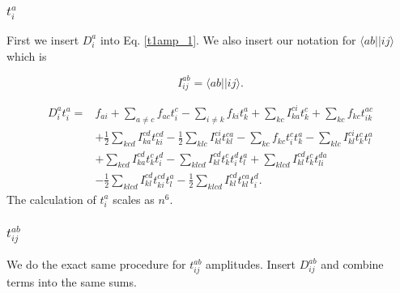 \subsubsection{$t_i^a$}
First we insert $D_i^a$ into Eq. \eqref{t1amp_1}. We also insert our notation for $\langle ab || ij \rangle$ which is

\begin{equation}
I_{ij}^{ab} = \langle ab || ij \rangle .
\end{equation}

\begin{align}
D_i^a t_i^a = & 
f_{ai} 
+ \sum_{a\not= c} f_{ac} t_i^c 
- \sum_{i \not= k} f_{ki} t_k^a 
+ \sum_{kc} I_{ka}^{ci} t_k^c 
+ \sum_{kc} f_{kc} t_{ik}^{ac} \nonumber \\ &
+ \frac{1}{2} \sum_{kcd} I_{ka}^{cd} t_{ki}^{cd} 
- \frac{1}{2} \sum_{klc} I_{kl}^{ci} t_{kl}^{ca} 
- \sum_{kc} f_{kc} t_i^c t_k^a 
- \sum_{klc} I_{kl}^{ci} t_k^c t_l^a \nonumber \\ & 
 + \sum_{kcd} I_{ka}^{cd} t_k^c t_i^d 
- \sum_{klcd} I_{kl}^{cd} t_k^c t_i^d t_l^a 
+ \sum_{klcd} I_{kl}^{cd} t_k^c t_{li}^{da} \nonumber \\ &
 - \frac{1}{2} \sum_{klcd} I_{kl}^{cd} t_{ki}^{cd} t_l^a 
- \frac{1}{2} \sum_{klcd} I_{kl}^{cd} t_{kl}^{ca} t_i^d
. 
\end{align}
The calculation of $t_i^a$ scales as $n^6$.

\subsubsection{$t_{ij}^{ab}$}
We do the exact same procedure for $t_{ij}^{ab}$ amplitudes. Insert $D_{ij}^{ab}$ and combine terms into the same sums.

